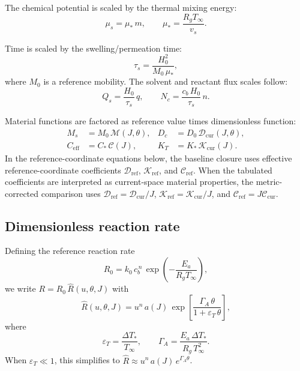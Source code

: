 \documentclass[11pt]{article}
\newcommand{\Ms}{\mathcal{M}}
\newcommand{\Ds}{\mathcal{D}}
\newcommand{\Cs}{\mathcal{C}}
\newcommand{\Ks}{\mathcal{K}}
\newcommand{\Rhat}{\widehat{R}}
\begin{document}
The chemical potential is scaled by the thermal mixing energy:
\begin{equation}
  \mu_s = \mu_*\,m, \qquad \mu_* = \frac{R_g T_\infty}{v_s}.
\end{equation}

Time is scaled by the swelling/permeation time:
\begin{equation}
  \tau_s = \frac{H_0^2}{M_0\,\mu_*},
\end{equation}
where $M_0$ is a reference mobility. The solvent and reactant flux scales follow:
\begin{equation}
  Q_s = \frac{H_0}{\tau_s}\,q,
  \qquad
  N_c = \frac{c_b\,H_0}{\tau_s}\,n.
\end{equation}

Material functions are factored as reference value times dimensionless function:
\begin{align}
  M_s &= M_0\,\Ms(J,\theta), &
  D_c &= D_0\,\Ds_\mathrm{cur}(J,\theta), \\
  C_\mathrm{eff} &= C_*\,\Cs(J), &
  K_T &= K_*\,\Ks_\mathrm{cur}(J).
\end{align}
In the reference-coordinate equations below, the baseline closure
uses effective reference-coordinate coefficients
$\Ds_\mathrm{ref}$, $\Ks_\mathrm{ref}$, and $\Cs_\mathrm{ref}$.
When the tabulated coefficients are interpreted as current-space
material properties, the metric-corrected comparison uses
$\Ds_\mathrm{ref}=\Ds_\mathrm{cur}/J$,
$\Ks_\mathrm{ref}=\Ks_\mathrm{cur}/J$, and
$\Cs_\mathrm{ref}=J\Cs_\mathrm{cur}$.

\subsection{Dimensionless reaction rate}

Defining the reference reaction rate
\begin{equation}
  R_0 = k_0\,c_b^{\,n}\,\exp\!\left(-\frac{E_a}{R_g T_\infty}\right),
\end{equation}
we write $R = R_0\,\Rhat(u,\theta,J)$ with
\begin{equation}
  \Rhat(u,\theta,J)
  = u^n\,a(J)\,
  \exp\!\left[\frac{\Gamma_A\,\theta}{1+\varepsilon_T\,\theta}\right],
  \label{eq:Rhat}
\end{equation}
where
\begin{equation}
  \varepsilon_T = \frac{\Delta T_*}{T_\infty},
  \qquad
  \Gamma_A = \frac{E_a\,\Delta T_*}{R_g\,T_\infty^2}.
  \label{eq:epsT_GammaA}
\end{equation}
When $\varepsilon_T \ll 1$, this simplifies to $\Rhat \approx u^n\,a(J)\,e^{\Gamma_A\theta}$.
\end{document}
